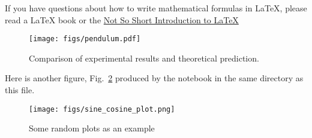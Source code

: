 \documentclass[journal, a4paper]{IEEEtran}
\begin{document}
If you have questions about how to write mathematical formulas in LaTeX, please read a LaTeX book or the \href{https://tobi.oetiker.ch/lshort/lshort.pdf}{Not So Short Introduction to LaTeX}

	\begin{figure}[h!bt]
		\begin{center}
		\texttt{[image: figs/pendulum.pdf]}
		\caption{Comparison of experimental results and theoretical prediction.}
		\label{fig:tf_plot}
		\end{center}
	\end{figure}

Here is another figure, Fig.~\ref{fig:tf_plot2} produced by the notebook in the same directory as this file.

\begin{figure}[!hbt]
	\centering
	\texttt{[image: figs/sine\_cosine\_plot.png]}
	\caption{Some random plots as an example}
	\label{fig:tf_plot2}
\end{figure}

\printbibliography[title={References}]

\end{document}
